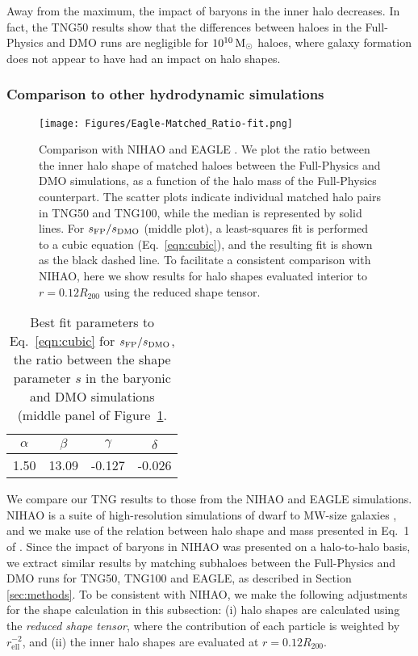 \documentclass[fleqn,usenatbib]{mnras}
\def\msun{\,\rm M_{\odot}}
\begin{document}
Away from the maximum, the impact of baryons in the inner halo decreases. 
In fact, the TNG50 results show that the differences between haloes in the Full-Physics and DMO runs are negligible for $10^{10} \msun$ haloes, where galaxy formation does not appear to have had an impact on halo shapes.


\subsubsection*{Comparison to other hydrodynamic simulations}

\begin{figure*}
    \centering
    \texttt{[image: Figures/Eagle-Matched\_Ratio-fit.png]}
    \caption{Comparison with NIHAO \protect\cite[][golden dashed lines]{Butsky16v462} and EAGLE \protect\cite[red dashed lines]{EAGLE}.
    We plot the ratio between the inner halo shape of matched haloes between the Full-Physics and DMO simulations, as a function of the halo mass of the Full-Physics counterpart.
    The scatter plots indicate individual matched halo pairs in TNG50 and TNG100, while the median is represented by solid lines.
    For $s_{\rm FP}/s_{\rm DMO}$ (middle plot), a least-squares fit is performed to a cubic equation (Eq.~\ref{eqn:cubic}), and the resulting fit is shown as the black dashed line.
    To facilitate a consistent comparison with NIHAO, here we show results for halo shapes evaluated interior to $r=0.12 R_{200}$ using the reduced shape tensor.
    }
    \label{fig:inner_matched}
\end{figure*}

\begin{table}
    \centering
    \begin{tabular}{c c c c}
        \hline
        $\alpha$ & $\beta$ & $\gamma$ & $\delta$\\
        \hline
        1.50 & 13.09 & -0.127 & -0.026 \\
        \hline
    \end{tabular}
    \caption{Best fit parameters to Eq.~\ref{eqn:cubic} for $s_{\rm FP} /s_{\rm DMO}$, the ratio between the shape parameter $s$ in the baryonic and DMO simulations (middle panel of Figure~\ref{fig:inner_matched}.
    }
    \label{tab:bestfit_nihao}
\end{table}

We compare our TNG results to those from the NIHAO and EAGLE simulations.
NIHAO is a suite of high-resolution simulations of dwarf to MW-size galaxies \citep{Wang15v454}, and we make use of the relation between halo shape and mass presented in Eq.~1 of \cite{Butsky16v462}.
Since the impact of baryons in NIHAO was presented on a halo-to-halo basis, we extract similar results by matching subhaloes between the Full-Physics and DMO runs for TNG50, TNG100 and EAGLE, as described in Section \ref{sec:methods}.
To be consistent with NIHAO, we make the following adjustments for the  shape calculation in this subsection:
(i) halo shapes are calculated using the \emph{reduced shape tensor}, where the contribution of each particle is weighted by $r_\text{ell}^{-2}$, and 
(ii) the inner halo shapes are evaluated at $r=0.12 R_{200}$.
\end{document}
